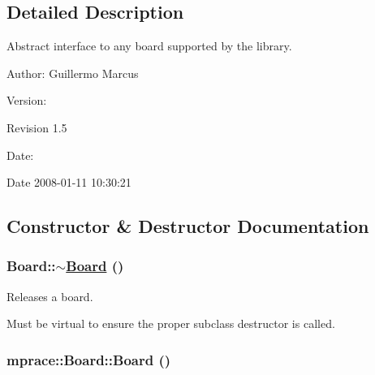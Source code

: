 \subsection{Detailed Description}
Abstract interface to any board supported by the library. 

\begin{Desc}
\item[Author:]Guillermo Marcus \end{Desc}
\begin{Desc}
\item[Version:]\begin{Desc}
\item[Revision]1.5 \end{Desc}
\end{Desc}
\begin{Desc}
\item[Date:]\begin{Desc}
\item[Date]2008-01-11 10:30:21 \end{Desc}
\end{Desc}




\subsection{Constructor \& Destructor Documentation}
\hypertarget{classmprace_1_1Board_a0}{
\subsubsection[$\sim$Board]{\setlength{\rightskip}{0pt plus 5cm}Board::$\sim$\hyperlink{classmprace_1_1Board}{Board} ()}}
\label{classmprace_1_1Board_a0}


Releases a board. 

Must be virtual to ensure the proper subclass destructor is called.\hypertarget{classmprace_1_1Board_b0}{
\subsubsection[Board]{\setlength{\rightskip}{0pt plus 5cm}mprace::Board::Board ()}}
\label{classmprace_1_1Board_b0}


